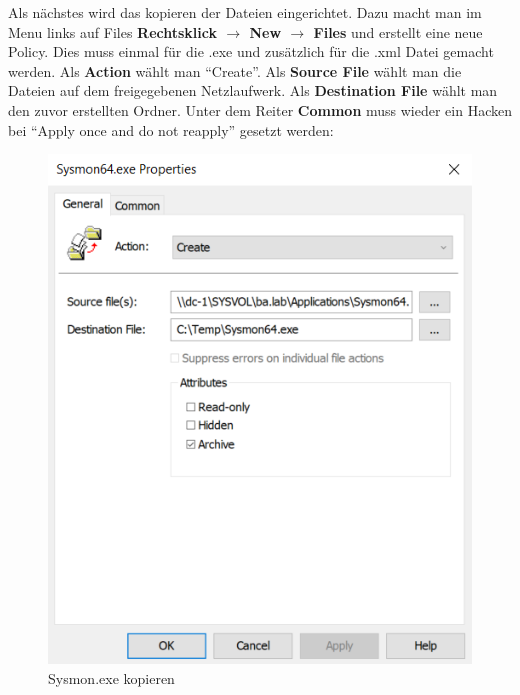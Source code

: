 Als nächstes wird das kopieren der Dateien eingerichtet.
Dazu macht man im Menu links auf Files \textbf{Rechtsklick $\rightarrow$ New $\rightarrow$ Files} und erstellt eine neue Policy.
Dies muss einmal für die .exe und zusätzlich für die .xml Datei gemacht werden.
Als \textbf{Action} wählt man ``Create''.
Als \textbf{Source File} wählt man die Dateien auf dem freigegebenen Netzlaufwerk.
Als \textbf{Destination File} wählt man den zuvor erstellten Ordner.
Unter dem Reiter \textbf{Common} muss wieder ein Hacken bei ``Apply once and do not reapply'' gesetzt werden:\\
\begin{minipage}{0.5\linewidth}
    \begin{figure}[H]
        \centering
        \includegraphics[width=\linewidth]{../img/sysmon/sysmon-file.png}
        \caption{Sysmon.exe kopieren}
    \end{figure}

\end{minipage}
